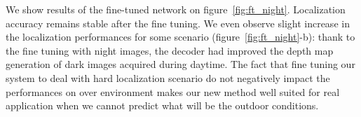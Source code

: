 We show results of the fine-tuned network on figure~\ref{fig:ft_night}. Localization accuracy remains stable after the fine tuning. We even observe slight increase in the localization performances for some scenario (figure~\ref{fig:ft_night}-b): thank to the fine tuning with night images, the decoder had improved the depth map generation of dark images acquired during daytime. The fact that fine tuning our system to deal with hard localization scenario do not negatively impact the performances on over environment makes our new method well suited for real application when we cannot predict what will be the outdoor conditions.

